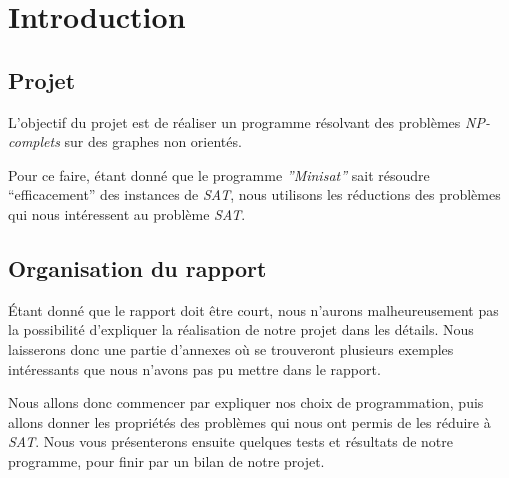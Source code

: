  \section{Introduction}

  \subsection{Projet}
  L'objectif du projet est de réaliser un programme résolvant des
  problèmes \emph{NP-complets} sur des graphes non orientés.

  Pour ce faire, étant donné que le programme \emph{''Minisat''} sait
  résoudre ``efficacement'' des instances de \emph{SAT}, nous utilisons
  les réductions des problèmes qui nous intéressent au problème
  \emph{SAT}.

  \subsection{Organisation du rapport}
  Étant donné que le rapport doit être court, nous n'aurons
  malheureusement pas la possibilité d'expliquer la réalisation de notre
  projet dans les détails. Nous laisserons donc une partie d'annexes où
  se trouveront plusieurs exemples intéressants que nous n'avons pas pu
  mettre dans le rapport.

  Nous allons donc commencer par expliquer nos choix de programmation,
  puis allons donner les propriétés des problèmes qui nous ont permis de
  les réduire à \emph{SAT}. Nous vous présenterons ensuite quelques
  tests et résultats de notre programme, pour finir par un bilan de
  notre projet.
